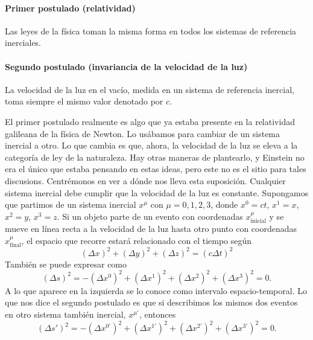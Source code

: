 \paragraph{Primer postulado (relatividad)} Las leyes de la física toman la misma forma en todos los sistemas de referencia inerciales.

\paragraph{Segundo postulado (invariancia de la velocidad de la luz)} La velocidad de la luz en el vacío, medida en un sistema de referencia inercial, toma siempre el mismo valor denotado por \(c\).

El primer postulado realmente es algo que ya estaba presente en la relatividad galileana de la física de Newton. Lo usábamos para cambiar de un sistema inercial a otro. Lo que cambia es que, ahora, la velocidad de la luz se eleva a la categoría de ley de la naturaleza. Hay otras maneras de plantearlo, y Einstein no era el único que estaba pensando en estas ideas, pero este no es el sitio para tales discusions. Centrémonos en ver a dónde nos lleva esta suposición. Cualquier sistema inercial debe cumplir que la velocidad de la luz es constante. Supongamos que partimos de un sistema inercial \(x^\mu\) con \(\mu = 0, 1, 2, 3\), donde \(x^0 = ct\), \(x^1 = x\), \(x^2 = y\), \(x^3 = z\). Si un objeto parte de un evento con coordenadas \(x_\text{inicial}^\mu\) y se mueve en línea recta a la velocidad de la luz hasta otro punto con coordenadas \(x_\text{final}^\mu\), el espacio que recorre estará relacionado con el tiempo según
\begin{equation*}
    \left(\Delta x\right)^2 + \left(\Delta y\right)^2 + \left(\Delta z\right)^2 = (c\Delta t)^2 
\end{equation*}
También se puede expresar como
\begin{equation}
    \label{eq.1-intervalo_esptemp}
    \left(\Delta s\right)^2 = - \left(\Delta x^0\right)^2 + \left(\Delta x^1\right)^2 + \left(\Delta x^2\right)^2 + \left(\Delta x^3\right)^2 = 0.
\end{equation}
A lo que aparece en la izquierda se lo conoce como intervalo espacio-temporal. Lo que nos dice el segundo postulado es que si describimos los mismos dos eventos en otro sistema también inercial, \(x^{\mu'}\), entonces 
\begin{equation*}
    \left(\Delta s'\right)^{2} = - \left(\Delta x^{0'}\right)^2 + \left(\Delta x^{1'}\right)^2 + \left(\Delta x^{2'}\right)^2 + \left(\Delta x^{3'}\right)^2 = 0.
\end{equation*}
